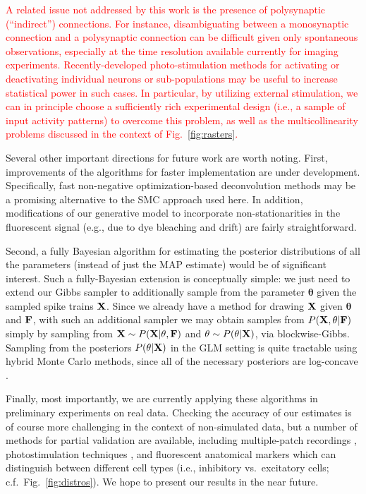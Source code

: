\documentclass[aoas,preprint]{imsart}
\providecommand{\tr}[1]{\textcolor{red}{#1}}
\newcommand{\bth}{\mathbf{\theta}}
\newcommand{\bF}{{\bf F}}
\newcommand{\bX}{{\bf X}}
\begin{document}
\tr{A related issue not addressed by this work is the presence of polysynaptic (``indirect'') connections. For instance, disambiguating between a monosynaptic connection and a polysynaptic connection can be difficult given only spontaneous observations, especially at the time resolution available currently for imaging experiments. Recently-developed photo-stimulation methods for activating or deactivating individual neurons or sub-populations \cite{Deisseroth05,SzobotaIsacoff07,Nikolenko08} may be useful to increase statistical power in such cases. In particular, by utilizing external stimulation, we can in principle choose a sufficiently rich experimental design (i.e., a sample of input activity patterns) to overcome this problem, as well as the multicollinearity problems discussed in the context of Fig.~\ref{fig:rasters}.}

Several other important directions for future work are worth noting.
First, improvements of the algorithms for faster implementation are
under development.  Specifically, fast non-negative optimization-based
deconvolution methods may be a promising alternative
\cite{Vogelstein08,Pan08b} to the SMC approach used here.  In
addition, modifications of our generative model to incorporate
non-stationarities in the fluorescent signal (e.g., due to dye
bleaching and drift) are fairly straightforward.

Second, a fully Bayesian algorithm for estimating the posterior
distributions of all the parameters (instead of just the MAP estimate)
would be of significant interest.  Such a fully-Bayesian extension is
conceptually simple: we just need to extend our Gibbs sampler to
additionally sample from the parameter $\bth$ given the sampled spike
trains $\bX$. Since we already have a method for drawing $\bX$ given
$\bth$ and $\bF$, with such an additional sampler we may obtain
samples from $P(\bX,\bth | \bF)$ simply by sampling from $\bX \sim
P(\bX|\theta,\bF)$ and $\bth \sim P(\bth |\bX)$, via blockwise-Gibbs.
Sampling from the posteriors $P(\bth|\bX)$ in the GLM setting is quite
tractable using hybrid Monte Carlo methods, since all of the necessary
posteriors are log-concave
\cite{Ishwaran99,Gamerman97,Gamerman98,Yashar08}.

Finally, most importantly, we are currently applying these algorithms
in preliminary experiments on real data.  Checking the accuracy of our
estimates is of course more challenging in the context of
non-simulated data, but a number of methods for partial validation are
available, including multiple-patch recordings \cite{Song2005},
photostimulation techniques \cite{Vovan07}, and fluorescent anatomical
markers which can distinguish between different cell types
\cite{Meyer02} (i.e., inhibitory vs.\ excitatory cells; c.f.\
Fig.~\ref{fig:distros}).  We hope to present our results in the near
future.
\end{document}
